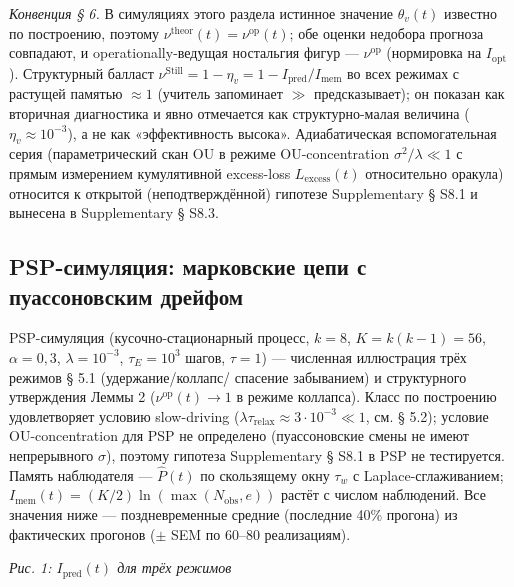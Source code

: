 \documentclass[pdflatex,sn-mathphys-ay]{sn-jnl}
\begin{document}
\emph{Конвенция § 6.} В симуляциях этого раздела истинное значение \(\theta_v(t)\) известно по построению, поэтому \(\nu^{\text{theor}}(t) = \nu^{\text{op}}(t)\); обе оценки недобора прогноза совпадают, и operationally-ведущая ностальгия фигур --- \(\nu^{\text{op}}\) (нормировка на \(I_{\text{opt}}\)). Структурный балласт \(\nu^{\text{Still}} = 1 - \eta_v = 1 - I_{\text{pred}}/I_{\text{mem}}\) во всех режимах с растущей памятью \(\approx 1\) (учитель запоминает \(\gg\) предсказывает); он показан как вторичная диагностика и явно отмечается как структурно-малая величина (\(\eta_v \approx 10^{-3}\)), а не как «эффективность высока». Адиабатическая вспомогательная серия (параметрический скан OU в режиме OU-concentration \(\sigma^2/\lambda \ll 1\) с прямым измерением кумулятивной excess-loss \(L_{\text{excess}}(t)\) относительно оракула) относится к открытой (неподтверждённой) гипотезе Supplementary § S8.1 и вынесена в Supplementary § S8.3.



\subsection{PSP-симуляция: марковские цепи с пуассоновским дрейфом}\label{psp-ux441ux438ux43cux443ux43bux44fux446ux438ux44f-ux43cux430ux440ux43aux43eux432ux441ux43aux438ux435-ux446ux435ux43fux438-ux441-ux43fux443ux430ux441ux441ux43eux43dux43eux432ux441ux43aux438ux43c-ux434ux440ux435ux439ux444ux43eux43c}



PSP-симуляция (кусочно-стационарный процесс, \(k = 8\), \(K = k(k-1) = 56\), \(\alpha = 0{,}3\), \(\lambda = 10^{-3}\), \(\tau_E = 10^3\) шагов, \(\tau = 1\)) --- численная иллюстрация трёх режимов § 5.1 (удержание/коллапс/ спасение забыванием) и структурного утверждения Леммы 2 (\(\nu^{\text{op}}(t) \to 1\) в режиме коллапса). Класс по построению удовлетворяет условию slow-driving (\(\lambda \tau_{\text{relax}} \approx 3 \cdot 10^{-3} \ll 1\), см. § 5.2); условие OU-concentration для PSP не определено (пуассоновские смены не имеют непрерывного \(\sigma\)), поэтому гипотеза Supplementary § S8.1 в PSP не тестируется. Память наблюдателя --- \(\hat P(t)\) по скользящему окну \(\tau_w\) с Laplace-сглаживанием; \(I_{\text{mem}}(t) = (K/2)\ln(\max(N_{\text{obs}}, e))\) растёт с числом наблюдений. Все значения ниже --- поздневременные средние (последние 40\% прогона) из фактических прогонов (\(\pm\) SEM по 60--80 реализациям).



\emph{Рис. 1: \(I_{\text{pred}}(t)\) для трёх режимов} 
\end{document}
